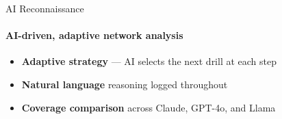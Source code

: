 
\begin{frame}{AI Reconnaissance}
  \framesubtitle{AI-driven, adaptive network analysis}
  \begin{itemize}
    \setlength\itemsep{0.8em}
    \item[\faLightbulb] \textbf{Adaptive strategy} — AI selects the next drill at each step
    \item[\faComments] \textbf{Natural language} reasoning logged throughout
    \item[\faChartBar] \textbf{Coverage comparison} across Claude, GPT-4o, and Llama
  \end{itemize}
  \vspace{0.8em}
  \begin{block}{}
    \centering
  \end{block}
\end{frame}

